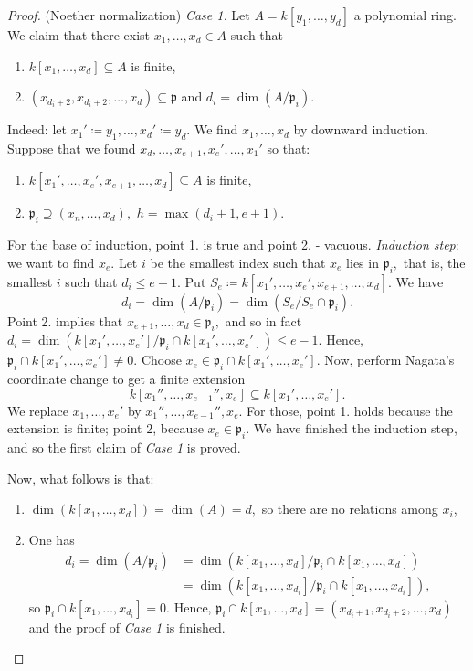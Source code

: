 \begin{proof}(Noether normalization)
  \emph{Case 1.} Let \(A = k[y_1, \dotsc, y_d]\) a polynomial ring. We claim that there exist \(x_1, \dotsc, x_d \in A\) such that
  \begin{enumerate}
  \item \(k[x_1, \dotsc, x_d] \subseteq A\) is finite,
  \item \((x_{d_i+2}, x_{d_i+2}, \dotsc, x_d) \subseteq \mathfrak p\) and \(d_i = \dim (A/{\mathfrak p_i}).\)
  \end{enumerate}
  Indeed: let \(x_1' \coloneqq y_1, \dotsc, x_d' \coloneqq y_d.\)
  We find \(x_1, \dotsc, x_d\) by downward induction.
  Suppose that we found
  \(x_d, \dotsc, x_{e+1}, x_e', \dotsc, x_1'\) so that:
  \begin{enumerate}
  \item \(k[x_1', \dotsc, x_e', x_{e+1}, \dotsc, x_d] \subseteq A\) is finite,
  \item \(\mathfrak p_i \supseteq (x_n, \dotsc, x_d),\) \(h = \max(d_i+1, e + 1).\)
  \end{enumerate}
  For the base of induction, point 1. is true and point 2. - vacuous.
  \emph{Induction step}: we want to find \(x_e.\)
  Let \(i\) be the smallest index such that \(x_e\) lies in \(\mathfrak p_i,\) that is, the smallest \(i\) such that
  \(d_i \leq e - 1.\)
  Put
  \(S_e \coloneqq k[x_1', \dotsc, x_e', x_{e+1}, \dotsc, x_d].\)
  We have
  \[d_i = \dim(A/{\mathfrak p_i}) = \dim(S_e/{S_e \cap \mathfrak p_i}).\]
  Point 2. implies that
  \(x_{e+1}, \dotsc, x_d \in \mathfrak p_i,\)
  and so in fact
  \(d_i = \dim(k[x_1', \dotsc, x_e']/{\mathfrak p_i \cap k[x_1', \dotsc, x_e']}) \leq e - 1.\)
  Hence,
  \(\mathfrak p_i \cap k[x_1', \dotsc, x_e'] \neq 0.\)
  Choose
  \(x_e \in \mathfrak p_i \cap k[x_1', \dotsc, x_e'].\)
  Now, perform Nagata's coordinate change to get a finite extension
  \[k[x_1'', \dotsc, x_{e-1}'', x_e] \subseteq k[x_1', \dotsc, x_e'].\]
  We replace \(x_1, \dotsc, x_e'\) by \(x_1'', \dotsc, x_{e-1}'', x_e.\)
  For those, point 1. holds because the extension is finite; point 2, because \(x_e \in \mathfrak p_i.\)
  We have finished the induction step, and so the first claim of \emph{Case 1} is proved.

  Now, what follows is that:
  \begin{enumerate}
    \item \(\dim(k[x_1, \dotsc, x_d]) = \dim(A) = d,\)
      so there are no relations among \(x_i\),
    \item One has
      \begin{align*}
        d_i = \dim(A/{\mathfrak p_i}) & = \dim(k[x_1, \dotsc, x_d]/{\mathfrak p_i \cap k[x_1, \dotsc, x_d]})\\
                                      & = \dim(k[x_1, \dotsc, x_{d_i}]/{\mathfrak p_i \cap k[x_1, \dotsc, x_{d_i}]}),
      \end{align*}
      so \(\mathfrak p_i \cap k[x_1, \dotsc, x_{d_i}] = 0.\)
      Hence, \(\mathfrak p_i \cap k[x_1, \dotsc, x_d] = (x_{d_i+1}, x_{d_i+2}, \dotsc, x_d)\) and the proof of \emph{Case 1} is finished.
  \end{enumerate}


\end{proof}
